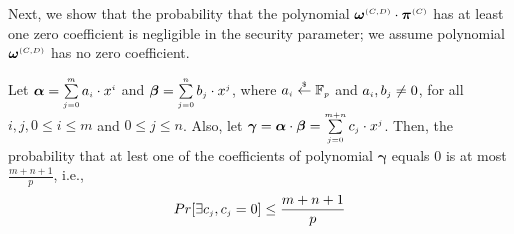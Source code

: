 Next, we show that the probability that the polynomial  $\bm\omega^{\scriptscriptstyle (C,D)}\cdot \bm\pi^{\scriptscriptstyle  {  {(C)}}}$ has at least one zero coefficient is negligible in the security parameter; we assume polynomial $\bm\omega^{\scriptscriptstyle (C,D)}$  has no zero coefficient. 



\begin{theorem}\label{theorem::zero-coeff-in-product}
Let  $\bm\alpha=\sum\limits_{\scriptscriptstyle j=0}^{\scriptscriptstyle m}a_{\scriptscriptstyle  i} \cdot x^{\scriptscriptstyle i}$ and  $\bm\beta=\sum\limits_{\scriptscriptstyle j=0}^{\scriptscriptstyle n}b_{\scriptscriptstyle  j} \cdot x^{\scriptscriptstyle j}$,  where $a_{\scriptscriptstyle i}\stackrel{\scriptscriptstyle\$}\leftarrow \mathbb{F}_{\scriptscriptstyle p}$ and $a_{\scriptscriptstyle i}, b_{\scriptscriptstyle j}\neq0$, for all $i,j, 0\leq i \leq m$ and $0\leq j \leq n$. Also, let $\bm\gamma=\bm\alpha\cdot\bm\beta=\sum\limits_{\scriptscriptstyle j=0}^{\scriptscriptstyle m+n}c_{\scriptscriptstyle  j} \cdot x^{\scriptscriptstyle j}$. Then, the probability that at lest one of the coefficients of polynomial $\bm\gamma$ equals $0$ is at most $\frac{m+n+1}{p}$, i.e., 
%
$$Pr[\exists c_{\scriptscriptstyle j}, c_{\scriptscriptstyle j}=0]\leq \frac{m+n+1}{p}$$
%
\end{theorem}



